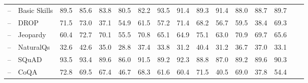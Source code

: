 \documentclass[table]{ai2style/ai2}
\begin{document}
\begin{table}[t]
{{\begin{NiceTabular}{@{}Hl
P{35pt}C{35pt}C{35pt}C{35pt}C{35pt}|C{35pt}C{35pt}C{35pt}C{35pt}C{35pt}C{35pt}C{35pt}C{35pt}C{35pt}@{}}
 -- & Basic Skills                                                                                           & 89.5                   & 85.6              & 83.8                & 80.5                & 82.2                 & 93.5              & 91.4                   & 89.3                & 91.4                 & 88.0                  & 88.7                    & 89.7             \\
 -- & DROP                                                                                                   & 71.5                   & 73.0              & 37.1                & 54.9                & 61.5                 & 57.2              & 71.4                   & 68.2                & 56.7                 & 59.5                  & 38.4                    & 69.3             \\
 -- & Jeopardy                                                                                               & 60.4                   & 72.7              & 70.1                & 55.5                & 70.8                 & 65.1              & 64.9                   & 75.1                & 63.0                 & 70.9                  & 69.7                    & 65.6             \\
 -- & NaturalQs                                                                                              & 32.6                   & 42.6              & 35.0                & 28.8                & 37.4                 & 33.8              & 31.2                   & 40.4                & 31.2                 & 36.7                  & 37.0                    & 33.1             \\
 -- & SQuAD                                                                                                  & 93.5                   & 93.4              & 89.6                & 86.0                & 91.5                 & 89.2              & 92.3                   & 88.8                & 87.0                 & 89.2                  & 89.6                    & 90.3             \\
 -- & CoQA                                                                                                   & 72.8                   & 69.5              & 67.4                & 46.7                & 68.3                 & 61.6              & 60.4                   & 71.5                & 40.5                 & 69.0                  & 37.8                    & 54.4             \\

\end{NiceTabular}}}
\end{table}
\end{document}
